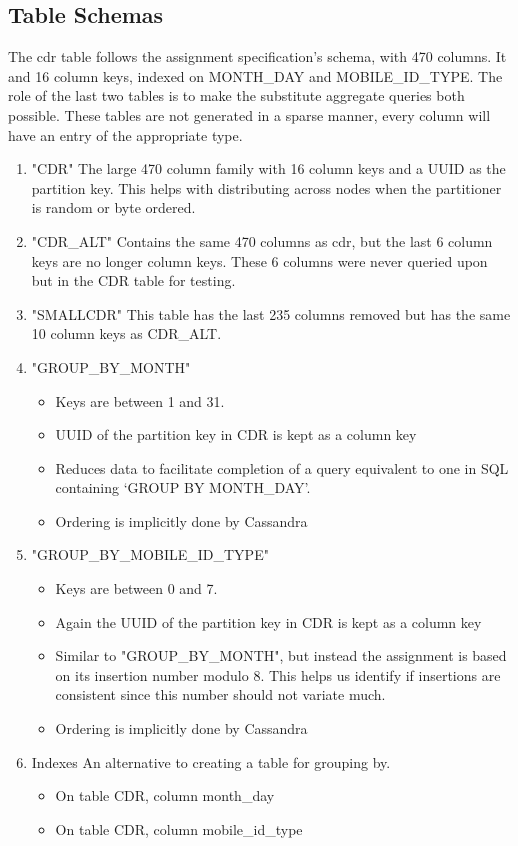 \documentclass[letterpaper]{article}
\begin{document}
\subsection{Table Schemas}
The cdr table follows the assignment specification's schema, with 470 columns.
It 
and 16 column keys, indexed on MONTH\_DAY and MOBILE\_ID\_TYPE.
The role of the last two tables is to make the substitute
aggregate queries both possible.
These tables are not generated in a sparse manner, every column will have an entry of the appropriate type.
\begin{enumerate}
	\item "CDR"
		The large 470 column family with 16
		column keys and a UUID as the partition key. This helps with distributing across nodes
		when the partitioner is random or byte ordered.

	\item "CDR\_ALT"
		Contains the same 470 columns as cdr, but the last 6 column
		keys are no longer column keys. These 6 columns were never queried upon but in the CDR table
		for testing.
		
	\item "SMALLCDR"
		This table has the last 235 columns removed but has the same 10 column keys as CDR\_ALT.

	\item "GROUP\_BY\_MONTH" 
		\begin{itemize}
			\item Keys are between 1 and 31.
			\item UUID of the partition key in CDR is kept as a column key
			\item Reduces data to facilitate completion of
				a query equivalent to one in SQL
				containing `GROUP BY MONTH\_DAY'.
			\item Ordering is implicitly done by Cassandra
		\end{itemize}
	\item "GROUP\_BY\_MOBILE\_ID\_TYPE"
		\begin{itemize}
			\item Keys are between 0 and 7.
			\item Again the UUID of the partition key in CDR is kept as a column key
			\item Similar to "GROUP\_BY\_MONTH", but instead
				the assignment
				is based on its insertion number modulo
				8. This helps us identify if insertions are consistent since 
				this number should not variate much.
				
			\item Ordering is implicitly done by Cassandra
		\end{itemize}
		
	\item Indexes
		 An alternative to creating a table for grouping by.
		\begin{itemize}
			\item On table CDR, column month\_day
			\item On table CDR, column mobile\_id\_type
		\end{itemize}
		
\end{enumerate}
\end{document}
